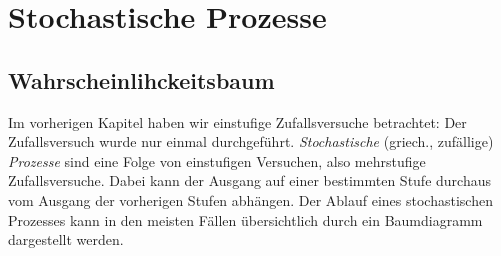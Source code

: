 \documentclass[%
11pt,%
twoside,%
titlepage,%
german,%
headsepline%
]{scrartcl}
\begin{document}
\clearpage

\section{Stochastische Prozesse}

\subsection{Wahrscheinlihckeitsbaum}

Im vorherigen Kapitel haben wir einstufige Zufallsversuche betrachtet: Der Zufallsversuch wurde nur einmal durchgeführt. \emph{Stochastische} (griech., zufällige) \emph{Prozesse} sind eine Folge von einstufigen Versuchen, also mehrstufige Zufallsversuche. Dabei kann der Ausgang auf einer bestimmten Stufe durchaus vom Ausgang der vorherigen Stufen abhängen. Der Ablauf eines stochastischen Prozesses kann in den meisten Fällen übersichtlich durch ein Baumdiagramm dargestellt werden.
\end{document}
